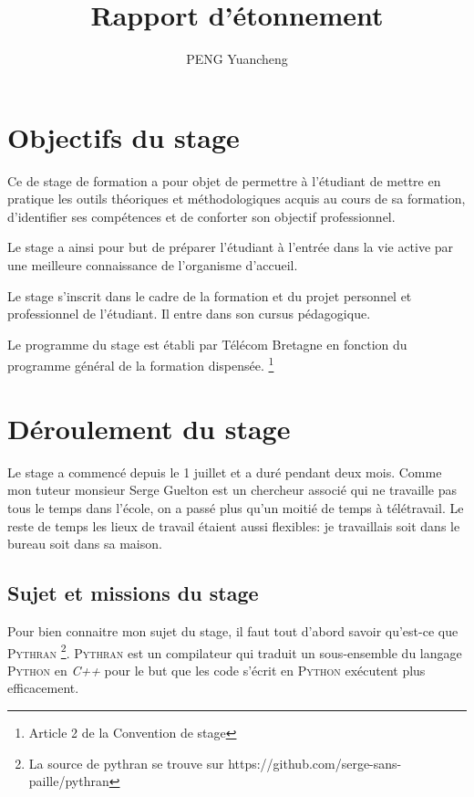 \documentclass[a4paper, 11pt]{article}
\newcommand\Pythran{\textsc{Pythran}}
\newcommand\Python{\textsc{Python}}
\begin{document}
\title{Rapport d'étonnement}
\author{PENG Yuancheng}
\maketitle

\tableofcontents
\setcounter{tocdepth}{3}
\pagebreak

\section{Objectifs du stage}

Ce de stage de formation a pour objet de permettre à l'étudiant de mettre en
pratique les outils théoriques et méthodologiques acquis au cours de sa
formation, d'identifier ses compétences et de conforter son objectif
professionnel.

Le stage a ainsi pour but de préparer l'étudiant à l'entrée dans la vie active
par une meilleure connaissance de l'organisme d'accueil.

Le stage s'inscrit dans le cadre de la formation et du projet personnel et
professionnel de l'étudiant. Il entre dans son cursus pédagogique.

Le programme du stage est établi par Télécom Bretagne en fonction du programme
général de la formation dispensée. \footnote{Article 2 de la Convention de stage}

\section{Déroulement du stage}
\label{sec:deroulement-stage}

Le stage a commencé depuis le 1 juillet et a duré pendant deux mois.
Comme mon tuteur monsieur Serge Guelton est un chercheur associé qui ne travaille
pas tous le temps dans l'école, on a passé plus qu'un moitié de temps à
télétravail. Le reste de temps les lieux de travail étaient aussi flexibles:
je travaillais soit dans le bureau soit dans sa maison.

\subsection*{Sujet et missions du stage}

Pour bien connaitre mon sujet du stage, il faut tout d'abord savoir qu'est-ce
que \Pythran{} \footnote{La source de pythran se trouve sur
https://github.com/serge-sans-paille/pythran}.
\Pythran{} est un compilateur qui traduit un sous-ensemble du
langage \Python{} en \emph{C++} pour le but que les code s'écrit en \Python{}
exécutent plus efficacement.
\end{document}
